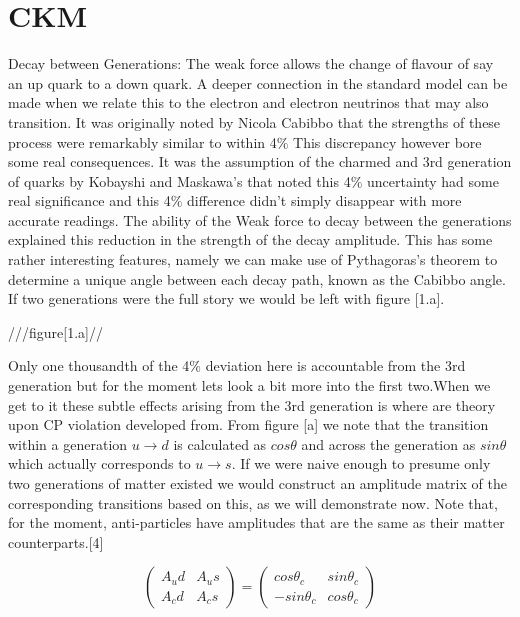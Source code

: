 
%
\section*{CKM}

Decay between Generations:
The weak force allows the change of flavour of say an up quark to a down quark. A deeper connection in the standard model can be made when we relate this to the electron and electron neutrinos that may also transition. It was originally noted by Nicola Cabibbo that the strengths of these process were remarkably similar to within 4$\%$ This discrepancy however bore some real consequences. It was the assumption of the charmed and 3rd generation of quarks by Kobayshi and Maskawa’s that noted this 4$\%$ uncertainty had some real significance and this 4$\%$ difference didn't simply disappear with more accurate readings. The ability of the Weak force to decay between the generations explained this reduction in the strength of the decay amplitude. This has some rather interesting features, namely we can make use of Pythagoras’s theorem to determine a unique angle between each decay path, known as the Cabibbo angle. If two generations were the full story we would be left with figure [1.a].

///figure[1.a]//

Only one thousandth of the 4$\%$ deviation here is accountable from the 3rd generation but for the moment lets look a bit more into the first two.When we get to it these subtle effects arising from the 3rd generation is where are theory upon CP violation developed from. From figure [a] we note that the transition within a generation $u\rightarrow d$ is calculated as $cos\theta$ and across the generation as $sin\theta$ which actually corresponds to $u\rightarrow s$. If we were naive enough to presume only two generations of matter existed we would construct an amplitude matrix of the corresponding transitions based on this, as we will demonstrate now. Note that, for the moment, anti-particles have amplitudes that are the same as their matter counterparts.[4]

\[\begin{pmatrix} A_ud & A_us \\ A_cd & A_cs \end{pmatrix} = \begin{pmatrix} cos\theta_c & sin\theta_c \\ -sin\theta_c & cos\theta_c \end{pmatrix}\]


